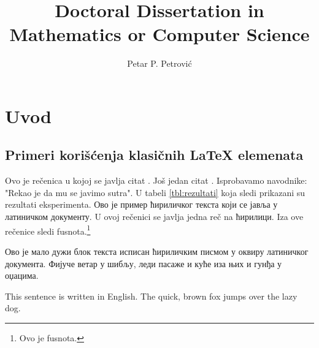 \documentclass[12pt,oneside]{memoir}
\author{Petar P. Petrović}
\title{Doctoral Dissertation in Mathematics or Computer Science}
\begin{document}
\frontmatter
\naslovna
\naslovnaen
\komisija
\apstrakt
\apstrakten
\tableofcontents*

\mainmatter

\chapter{Uvod}
\pangrami

\section{Primeri korišćenja klasičnih \LaTeX{} elemenata}
Ovo je rečenica u kojoj se javlja citat \cite{PetrovicMikic2015}.
Još jedan citat \cite{GuSh:243}.
Isprobavamo navodnike: "Rekao je da mu se javimo sutra".
U tabeli \ref{tbl:rezultati} koja sledi prikazani su rezultati eksperimenta.
{\cir Ово је пример ћириличког текста који се јавља у латиничком документу.}
U ovoj rečenici se javlja jedna reč na {\cir ћирилици}.
Iza ove rečenice sledi fusnota.\footnote{Ovo je fusnota.}

\begin{cirilica}
  Ово је мало дужи блок текста исписан ћириличким писмом у оквиру
  латиничког документа. Фијуче ветар у шибљу, леди пасаже и куће иза
  њих и гунђа у оџацима.
\end{cirilica}

\begin{english}
  This sentence is written in English. The quick, brown fox jumps over the
  lazy dog.
\end{english}
\end{document}
